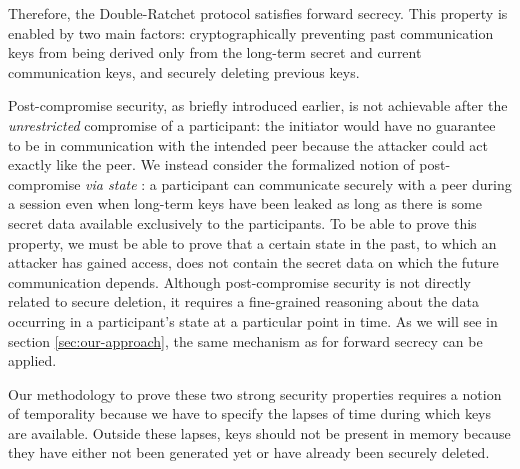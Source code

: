 \documentclass{article}
\begin{document}
Therefore, the Double-Ratchet protocol satisfies forward secrecy. This property is enabled by two main factors: cryptographically preventing past communication keys from being derived only from the long-term secret and current communication keys, and securely deleting previous keys.

Post-compromise security, as briefly introduced earlier, is not achievable after the \emph{unrestricted} compromise of a participant: the initiator would have no guarantee to be in communication with the intended peer because the attacker could act exactly like the peer.
We instead consider the formalized notion of post-compromise \emph{via state} \cite{7536374}:
a participant can communicate securely with a peer during a session even when long-term keys have been leaked as long as there is some secret data available exclusively to the participants.
To be able to prove this property, we must be able to prove that a certain state in the past, to which an attacker has gained access, does not contain the secret data on which the future communication depends. %
Although post-compromise security is not directly related to secure deletion, it requires a fine-grained reasoning about the data occurring in a participant's state at a particular point in time. As we will see in section \ref*{sec:our-approach}, the same mechanism as for forward secrecy can be applied.

Our methodology to prove these two strong security properties requires a notion of temporality because we have to specify the lapses of time during which keys are available. Outside these lapses, keys should not be present in memory because they have either not been generated yet or have already been securely deleted.
\end{document}
